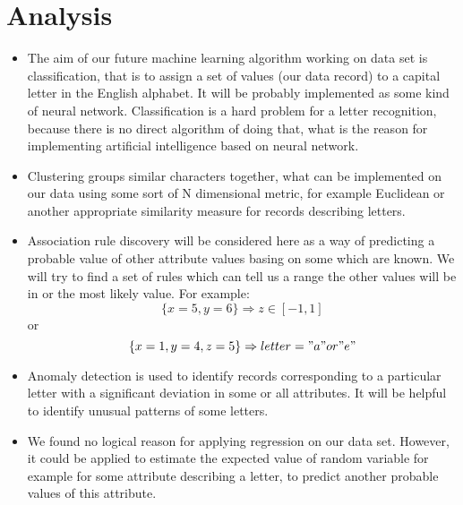 \section*{Analysis}
\begin{itemize}
\item The aim of our future machine learning algorithm working on data set is
classification, that is to assign a set of values (our data record) to a
capital letter in the English alphabet. It will be probably implemented as
some kind of neural network. Classification is a hard problem for a letter
recognition, because there is no direct algorithm of doing that, what is the
reason for implementing artificial intelligence based on neural network.
\item Clustering groups similar characters together, what can be implemented on
our data using some sort of N dimensional metric, for example Euclidean or
another appropriate similarity measure for records describing letters.
\item Association rule discovery will be considered here as a way of predicting
a probable value of other attribute values basing on some which are known.
We will try to find a set of rules which can tell us a range the other values
will be in or the most likely value. For example:
$$
\{ x = 5, y = 6 \} \Rightarrow z \in [-1,1]
$$
or
$$
\{ x = 1, y = 4, z = 5 \} \Rightarrow letter = "a" or "e"
$$
\item Anomaly detection is used to identify records corresponding to a particular
letter with a significant deviation in some or all attributes. It will be helpful
to identify unusual patterns of some letters.
\item We found no logical reason for applying regression on our data set. However,
it could be applied to estimate the expected value of random variable for example
for some attribute describing a letter, to predict another probable values of this attribute.
\end{itemize}

